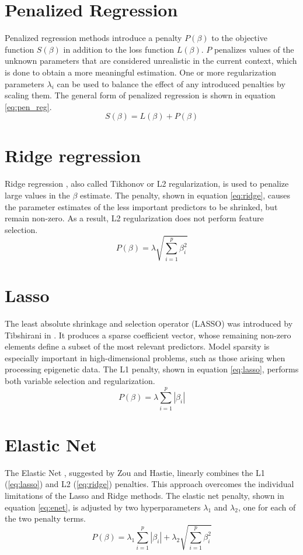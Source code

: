 \section{Penalized Regression}
Penalized regression methods introduce a penalty $P(\beta)$ to the objective function $S(\beta)$ in addition to the loss function $L(\beta)$. $P$ penalizes values of the unknown parameters that are considered unrealistic in the current context, which is done to obtain a more meaningful estimation. One or more regularization parameters $\lambda_i$ can be used to balance the effect of any introduced penalties by scaling them. The general form of penalized regression is shown in equation \ref{eq:pen_reg}. 
\begin{equation} \label{eq:pen_reg}
S(\beta) = L(\beta) + P(\beta)
\end{equation}


\section{Ridge regression}
Ridge regression \cite{hoerl1970ridge}, also called Tikhonov or L2 regularization, is used to penalize large values in the $\beta$ estimate. The penalty, shown in equation \ref{eq:ridge}, causes the parameter estimates of the less important predictors to be shrinked, but remain non-zero. As a result, L2 regularization does not perform feature selection.
\begin{equation} \label{eq:ridge}
P(\beta) = \lambda\sqrt{\sum_{i=1}^{p}\beta_i^2}
\end{equation}


\section{Lasso}
The least absolute shrinkage and selection operator (LASSO) was introduced by Tibshirani in \cite{tibshirani1996regression}. It produces a sparse coefficient vector, whose remaining non-zero elements define a subset of the most relevant predictors. Model sparsity is especially important in high-dimensional problems, such as those arising when processing epigenetic data. The L1 penalty, shown in equation \ref{eq:lasso}, performs both variable selection and regularization.
\begin{equation} \label{eq:lasso}
P(\beta) = \lambda\sum_{i=1}^{p}\left|\beta_i\right|
\end{equation}


\section{Elastic Net}
The Elastic Net \cite{zou2005regularization}, suggested by Zou and Hastie, linearly combines the L1 (\ref{eq:lasso}) and L2 (\ref{eq:ridge}) penalties. This approach overcomes the individual limitations of the Lasso and Ridge methods. The elastic net penalty, shown in equation \ref{eq:enet}, is adjusted by two hyperparameters $\lambda_1$ and $\lambda_2$, one for each of the two penalty terms.
\begin{equation} \label{eq:enet}
P(\beta) = \lambda_1\sum_{i=1}^{p}\left|\beta_i\right| + \lambda_2\sqrt{\sum_{i=1}^{p}\beta_i^2}
\end{equation}


